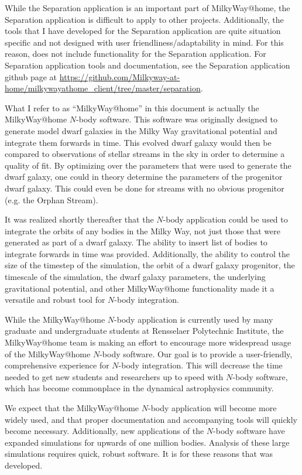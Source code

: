 \documentclass{article}
\begin{document}
While the Separation application is an important part of MilkyWay@home, the Separation application is difficult to apply to other projects. Additionally, the tools that I have developed for the Separation application are quite situation specific and not designed with user friendliness/adaptability in mind. For this reason, \mwahpy does not include functionality for the Separation application. For Separation application tools and documentation, see the Separation application github page at \url{https://github.com/Milkyway-at-home/milkywayathome_client/tree/master/separation}.

What I refer to as ``MilkyWay@home'' in this document is actually the MilkyWay@home $N$-body software. This software was originally designed to generate model dwarf galaxies in the Milky Way gravitational potential and integrate them forwards in time. This evolved dwarf galaxy would then be compared to observations of stellar streams in the sky in order to determine a quality of fit. By optimizing over the parameters that were used to generate the dwarf galaxy, one could in theory determine the parameters of the progenitor dwarf galaxy. This could even be done for streams with no obvious progenitor (e.g. the Orphan Stream). 

It was realized shortly thereafter that the $N$-body application could be used to integrate the orbits of any bodies in the Milky Way, not just those that were generated as part of a dwarf galaxy. The ability to insert list of bodies to integrate forwards in time was provided. Additionally, the ability to control the size of the timestep of the simulation, the orbit of a dwarf galaxy progenitor, the timescale of the simulation, the dwarf galaxy parameters, the underlying gravitational potential, and other MilkyWay@home functionality made it a versatile and robust tool for $N$-body integration. 

While the MilkyWay@home $N$-body application is currently used by many graduate and undergraduate students at Rensselaer Polytechnic Institute, the MilkyWay@home team is making an effort to encourage more widespread usage of the MilkyWay@home $N$-body software. Our goal is to provide a user-friendly, comprehensive experience for $N$-body integration. This will decrease the time needed to get new students and researchers up to speed with $N$-body software, which has become commonplace in the dynamical astrophysics community. 

We expect that the MilkyWay@home $N$-body application will become more widely used, and that proper documentation and accompanying tools will quickly become necessary. Additionally, new applications of the $N$-body software have expanded simulations for upwards of one million bodies. Analysis of these large simulations requires quick, robust software. It is for these reasons that \mwahpy was developed. 
\end{document}

